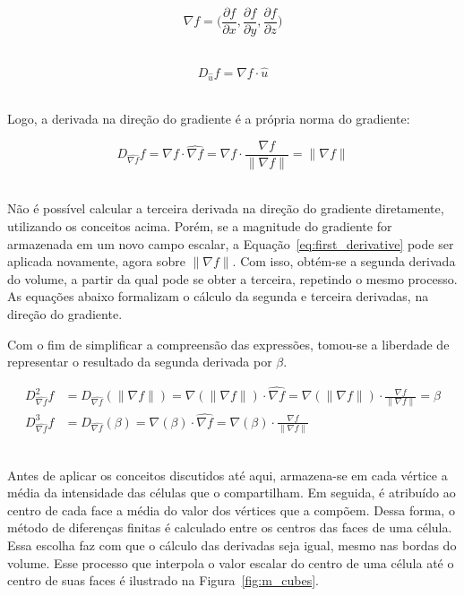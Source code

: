 \begin{equation}\label{eq:grad}
	\nabla f = \bigg(\frac{\partial f}{\partial x}, \frac{\partial f}{\partial y}, \frac{\partial f}{\partial z}\bigg)
\end{equation} \

\begin{equation}\label{eq:ddir}
D_{\widehat{u}} f = \nabla f \cdot \widehat{u}
\end{equation} \

	Logo, a derivada na direção do gradiente é a própria norma do gradiente:

\begin{equation}\label{eq:first_derivative}
	D_{\widehat{\nabla f}} f = \nabla f \cdot \widehat{\nabla f} = \nabla f \cdot \frac{\nabla f}{\|\nabla f\|} = \|\nabla f\|
\end{equation} \

	Não é possível calcular a terceira derivada na direção do gradiente diretamente, utilizando os conceitos acima. Porém, se a magnitude do gradiente for armazenada em um novo campo escalar, a Equação~\eqref{eq:first_derivative} pode ser aplicada novamente, agora sobre $ \|\nabla f\| $. Com isso, obtém-se a segunda derivada do volume, a partir da qual pode se obter a terceira, repetindo o mesmo processo. As equações abaixo formalizam o cálculo da segunda e terceira derivadas, na direção do gradiente. 
	
	Com o fim de simplificar a compreensão das expressões, tomou-se a liberdade de representar o resultado da segunda derivada por $ \beta $.
	
\begin{align}
	\label{eq:second_derivative}
	D^{2}_{\widehat{\nabla f}} f & = D_{\widehat{\nabla f}} (\|\nabla f\|) = \nabla (\|\nabla f\|) \cdot \widehat{\nabla f} = \nabla (\|\nabla f\|) \cdot \frac{\nabla f}{\|\nabla f\|} = \beta \\
	\label{eq:third_derivative}
	D^{3}_{\widehat{\nabla f}} f & = D_{\widehat{\nabla f}} (\beta) = \nabla (\beta) \cdot \widehat{\nabla f} = \nabla (\beta) \cdot \frac{\nabla f}{\|\nabla f\|}
\end{align} \

	Antes de aplicar os conceitos discutidos até aqui, armazena-se em cada vértice a média da intensidade das células que o compartilham. Em seguida, é atribuído ao centro de cada face a média do valor dos vértices que a compõem. Dessa forma, o método de diferenças finitas é calculado entre os centros das faces de uma célula. Essa escolha faz com que o cálculo das derivadas seja igual, mesmo nas bordas do volume. Esse processo que interpola o valor escalar do centro de uma célula até o centro de suas faces é ilustrado na Figura~\ref{fig:m_cubes}.
	
